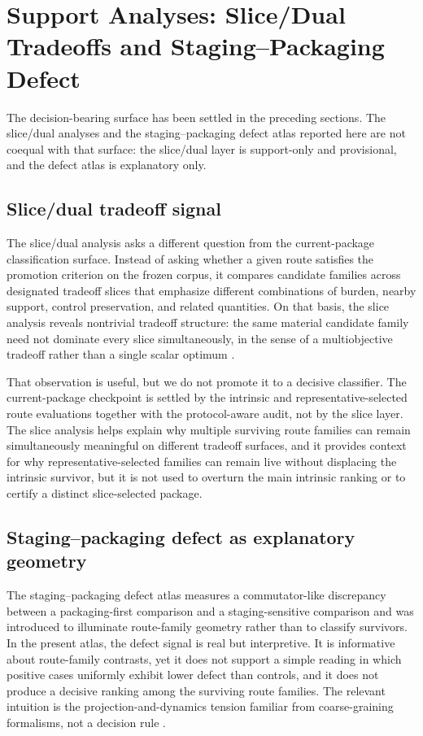 \documentclass[11pt]{article}
\theoremstyle{definition}
\begin{document}
  \section{Support Analyses: Slice/Dual Tradeoffs and Staging--Packaging Defect}\label{sec:support}

The decision-bearing surface has been settled in the preceding sections. The slice/dual analyses and the staging--packaging defect atlas reported here are not coequal with that surface: the slice/dual layer is support-only and provisional, and the defect atlas is explanatory only.

\subsection{Slice/dual tradeoff signal}

The slice/dual analysis asks a different question from the current-package classification surface. Instead of asking whether a given route satisfies the promotion criterion on the frozen corpus, it compares candidate families across designated tradeoff slices that emphasize different combinations of burden, nearby support, control preservation, and related quantities. On that basis, the slice analysis reveals nontrivial tradeoff structure: the same material candidate family need not dominate every slice simultaneously, in the sense of a multiobjective tradeoff rather than a single scalar optimum \citep{Pareto1896,Miettinen1998,Ehrgott2005}.

That observation is useful, but we do not promote it to a decisive classifier. The current-package checkpoint is settled by the intrinsic and representative-selected route evaluations together with the protocol-aware audit, not by the slice layer. The slice analysis helps explain why multiple surviving route families can remain simultaneously meaningful on different tradeoff surfaces, and it provides context for why representative-selected families can remain live without displacing the intrinsic survivor, but it is not used to overturn the main intrinsic ranking or to certify a distinct slice-selected package.

\subsection{Staging--packaging defect as explanatory geometry}

The staging--packaging defect atlas measures a commutator-like discrepancy between a packaging-first comparison and a staging-sensitive comparison and was introduced to illuminate route-family geometry rather than to classify survivors. In the present atlas, the defect signal is real but interpretive. It is informative about route-family contrasts, yet it does not support a simple reading in which positive cases uniformly exhibit lower defect than controls, and it does not produce a decisive ranking among the surviving route families. The relevant intuition is the projection-and-dynamics tension familiar from coarse-graining formalisms, not a decision rule \citep{Zwanzig1960,Mori1965,Kadanoff1966,Wilson1971}.
\end{document}
